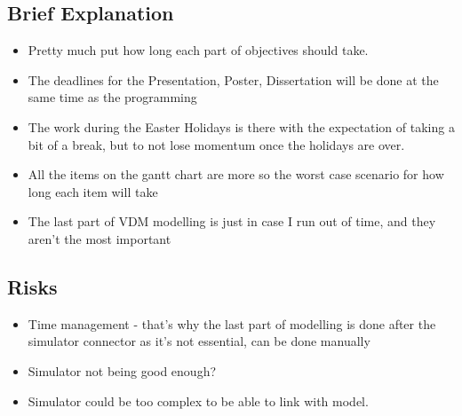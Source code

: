 \documentclass[a4paper]{article}
\begin{document}
\begin{ganttchart}
\end{ganttchart}

\subsection{Brief Explanation}
\begin{itemize}
  \item Pretty much put how long each part of objectives should take.
  \item The deadlines for the Presentation, Poster, Dissertation
    will be done at the same time as the programming
  \item The work during the Easter Holidays is there with  
    the expectation of taking a bit of a break, but to not
    lose momentum once the holidays are over.
  \item All the items on the gantt chart are more so the worst
    case scenario for how long each item will take
  \item The last part of VDM modelling is just in case I run out
    of time, and they aren't the most important
\end{itemize}

\subsection{Risks}
\begin{itemize}
\item Time management - that's why the last part of modelling is
  done after the simulator connector as it's not essential,
  can be done manually
\item Simulator not being good enough?
\item Simulator could be too complex to be able to link with model.
\end{itemize}
\end{document}
